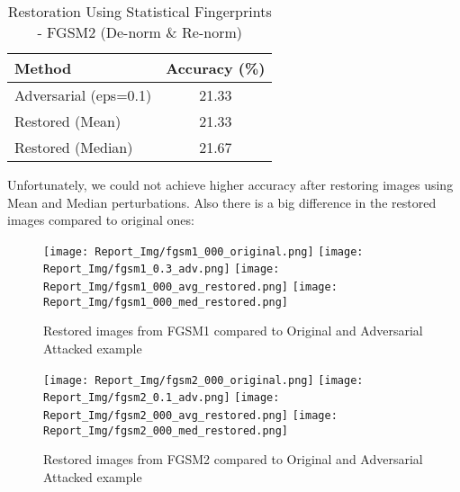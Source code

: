 \documentclass[a4paper,12pt]{report}
\begin{document}
\begin{table}[H]
\centering
\caption{Restoration Using Statistical Fingerprints - FGSM2 (De-norm \& Re-norm)}
\begin{tabular}{|l|c|}
\hline
Method & Accuracy (\%) \\
\hline
Adversarial (eps=0.1)        & 21.33 \\
Restored (Mean)   & 21.33 \\
Restored (Median) & 21.67 \\
\hline
\end{tabular}
\end{table}
Unfortunately, we could not achieve higher accuracy after restoring images using Mean and Median perturbations. Also there is a big difference in the restored images compared to original ones:

\begin{figure}[!htb]
  \texttt{[image: Report\_Img/fgsm1\_000\_original.png]}
\endminipage\hfill
{}
  \texttt{[image: Report\_Img/fgsm1\_0.3\_adv.png]}
\endminipage\hfill
{}
  \texttt{[image: Report\_Img/fgsm1\_000\_avg\_restored.png]}
\endminipage\hfill
{}%
  \texttt{[image: Report\_Img/fgsm1\_000\_med\_restored.png]}
\endminipage
  \caption{Restored images from FGSM1 compared to Original and Adversarial Attacked example}\label{fig:awesome_image1}
\end{figure}


\begin{figure}[!htb]
  \texttt{[image: Report\_Img/fgsm2\_000\_original.png]}
\endminipage\hfill
{}
  \texttt{[image: Report\_Img/fgsm2\_0.1\_adv.png]}
\endminipage\hfill
{}
  \texttt{[image: Report\_Img/fgsm2\_000\_avg\_restored.png]}
\endminipage\hfill
{}%
  \texttt{[image: Report\_Img/fgsm2\_000\_med\_restored.png]}
\endminipage
  \caption{Restored images from FGSM2 compared to Original and Adversarial Attacked example}\label{fig:awesome_image1}
\end{figure}
\end{document}
